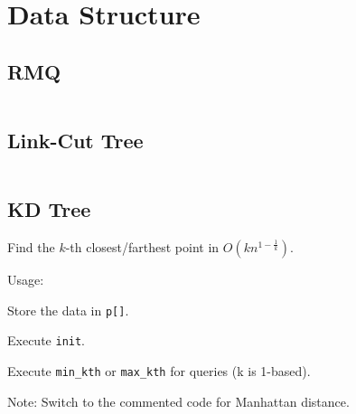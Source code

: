\chapter{Data Structure}

\section{RMQ}
\inputminted{c++}{301-rmq.cpp}

\section{Link-Cut Tree}
\inputminted{c++}{302-link-cut-tree.cpp}

\section{KD Tree}
Find the $k$-th closest/farthest point in $O(kn^{1-\frac{1}{k}})$.

Usage:
\begin{inparaenum}
    \item Store the data in \texttt{p[]}.
    \item Execute \texttt{init}.
    \item Execute \texttt{min\_kth} or \texttt{max\_kth} for queries (k is 1-based).
\end{inparaenum}

Note: Switch to the commented code for Manhattan distance.
\inputminted{c++}{303-kd-tree.cpp}